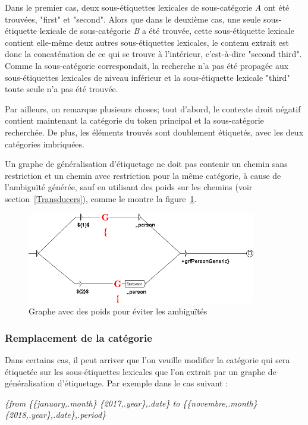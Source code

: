 \bigskip
Dans le premier cas, deux sous-étiquettes lexicales de sous-catégorie \textit{A} ont été trouvées, "first" et "second". Alors que dans le deuxième cas, une seule sous-étiquette lexicale de sous-catégorie \textit{B} a été trouvée, cette sous-étiquette lexicale contient elle-même deux autres sous-étiquettes lexicales, le contenu extrait est donc la concaténation de ce qui se trouve à l'intérieur, c'est-à-dire "second third". Comme la sous-catégorie correspondait, la recherche n'a pas été propagée aux sous-étiquettes lexicales de niveau inférieur et la sous-étiquette lexicale "third" toute seule n'a pas été trouvée.

Par ailleurs, on remarque plusieurs choses; tout d'abord, le contexte droit négatif contient maintenant la catégorie du token principal et la sous-catégorie recherchée. De plus, les éléments trouvés sont doublement étiquetés, avec les deux catégories imbriquées.

\bigskip
Un graphe de généralisation d'étiquetage ne doit pas contenir un chemin sans restriction et un chemin avec restriction pour la même catégorie, à cause de l'ambiguïté générée, sauf en utilisant des poids sur les chemins (voir section~\ref{Transducers}), comme le montre la figure~\ref{fig:graphe_poids}.

\begin{figure}[!htb]
  \centering
  \includegraphics[width=10cm]{resources/img/graphe_poids.png}
  \caption{Graphe avec des poids pour éviter les ambiguïtés}
  \label{fig:graphe_poids}
\end{figure}

\bigskip
\subsubsection{Remplacement de la catégorie}

Dans certains cas, il peut arriver que l'on veuille modifier la catégorie qui sera étiquetée sur les sous-étiquettes lexicales que l'on extrait par un graphe de généralisation d'étiquetage. Par exemple dans le cas suivant :


\emph{\{from \{\{january,.month\} \{2017,.year\},.date\} to \{\{novembre,.month\} \{2018,.year\},.date\},.period\}}


